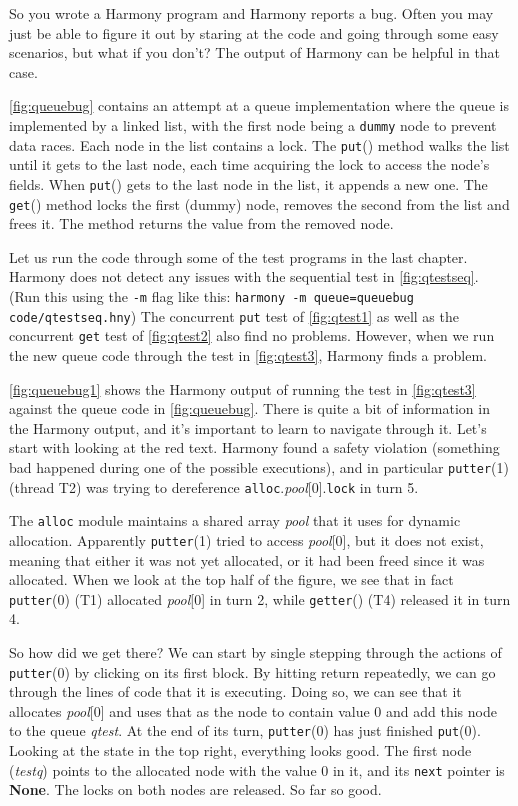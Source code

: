 \documentclass{report}
\begin{document}
So you wrote a Harmony program and Harmony reports a bug.
Often you may just be able to figure it out by staring at the code and
going through some easy scenarios, but what if you don't?
The output of Harmony can be helpful in that case.

\autoref{fig:queuebug} contains an attempt at a queue implementation
where the queue is implemented by a linked list, with the first node
being a \texttt{dummy} node to prevent data races.  Each node in the
list contains a lock.  The \texttt{put}() method walks the list until
it gets to the last node, each time acquiring the lock to access the
node's fields.  When \texttt{put}() gets to the last node in the list,
it appends a new one.  The \texttt{get}() method locks the first (dummy)
node, removes the second from the list and frees it.  The method returns
the value from the removed node.

Let us run the code through some of the test programs in the last
chapter.  Harmony does not detect any issues with the sequential test
in \autoref{fig:qtestseq}.
(Run this using the \texttt{-m} flag like this:
\texttt{harmony -m queue=queuebug code/qtestseq.hny})
The concurrent \texttt{put} test of
\autoref{fig:qtest1} as well as the concurrent \texttt{get} test of
\autoref{fig:qtest2} also find no problems.  However, when we run
the new queue code through the test in \autoref{fig:qtest3}, Harmony
finds a problem.

\autoref{fig:queuebug1} shows the Harmony output of running
the test in \autoref{fig:qtest3} against the queue code
in \autoref{fig:queuebug}.
There is quite a bit of information in the Harmony output, and it's
important to learn to navigate through it.
Let's start with looking at the red text.  Harmony found a safety
violation (something bad happened during one of the possible executions),
and in particular \texttt{putter}(1) (thread T2) was trying to dereference
\texttt{alloc}.\textit{pool}[0].\texttt{lock} in turn 5.

The \texttt{alloc} module maintains a shared array \textit{pool} that
it uses for dynamic allocation.  Apparently \texttt{putter}(1) tried to access
\textit{pool}[0], but it does not exist, meaning that either it was not
yet allocated, or it had been freed since it was allocated.
When we look at the top half of the figure, we see that in fact
\texttt{putter}(0) (T1) allocated \textit{pool}[0] in turn 2, while
\texttt{getter}() (T4) released it in turn 4.

So how did we get there?  We can start by single stepping through the
actions of \texttt{putter}(0) by clicking on its first block.
By hitting return repeatedly, we can go through the lines of code that
it is executing.  Doing so, we can see that it allocates
\textit{pool}[0] and uses that as the node to contain value 0 and add
this node to the queue \textit{qtest}.  At the end of its turn,
\texttt{putter}(0) has just finished \texttt{put}(0).  Looking at the
state in the top right, everything looks good.  The first node
(\textit{testq}) points to the allocated node with the value 0 in it,
and its \texttt{next} pointer is \textbf{None}.  The locks on both nodes
are released.  So far so good.
\end{document}
